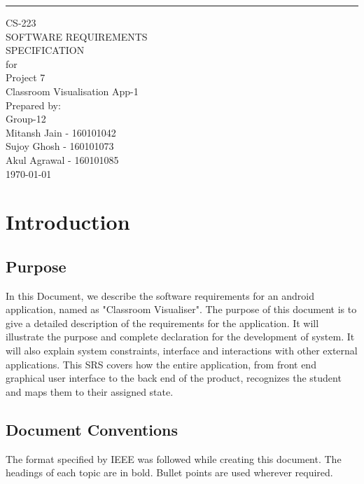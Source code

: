 \documentclass{scrreprt}
\date{}
\title{}
\begin{document}
\begin{flushright}
    \rule{16cm}{5pt}\vskip1cm
    \begin{bfseries}
        \Huge{CS-223\\SOFTWARE REQUIREMENTS\\ SPECIFICATION}\\
        \vspace{1.5cm}
        for\\
        \vspace{1.5cm}
        Project 7\\
        Classroom Visualisation App-1\\
        
        \vspace{1.9cm}
        \LARGE{Prepared by: }\\
        Group-12\\
        Mitansh Jain - 160101042\\
        Sujoy Ghosh - 160101073\\
        Akul Agrawal - 160101085\\
        \vspace{1.9cm}
        \today\\
    \end{bfseries}
\end{flushright}
\tableofcontents


\chapter{Introduction}

\section{Purpose}
In this Document, we describe the software requirements for an
android application, named as "Classroom Visualiser". The
purpose of this document is to give a detailed description of the requirements
for the application. It will illustrate the purpose and complete declaration for the
development of system. It will also explain system constraints, interface and
interactions with other external applications. This SRS covers how the entire
application, from front end graphical user interface to the back end of the
product, recognizes the student and maps them to their assigned state.

\section{Document Conventions}
The format specified by IEEE was followed while creating this document. 
The headings of each topic are in bold. Bullet points are used
wherever required.
\end{document}
